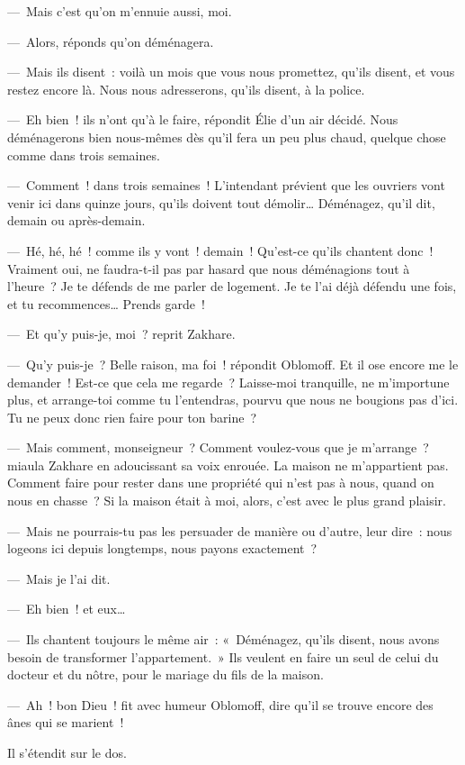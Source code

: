 \documentclass[french,twoside]{book} %
\begin{document}
— Mais c’est qu’on m’ennuie aussi, moi.\par
— Alors, réponds qu’on déménagera.\par
— Mais ils disent : voilà un mois que vous nous promettez, qu’ils disent, et vous restez encore là. Nous nous adresserons, qu’ils disent, à la police.\par
— Eh bien ! ils n’ont qu’à le faire, répondit Élie d’un air décidé. Nous déménagerons bien nous-mêmes dès qu’il fera un peu plus chaud, quelque chose comme dans trois semaines.\par
— Comment ! dans trois semaines ! L’intendant prévient que les ouvriers vont venir ici dans quinze jours, qu’ils doivent tout démolir… Déménagez, qu’il dit, demain ou après-demain.\par
— Hé, hé, hé ! comme ils y vont ! demain ! Qu’est-ce qu’ils chantent donc ! Vraiment oui, ne faudra-t-il pas par hasard que nous déménagions tout à l’heure ? Je te défends de me parler de logement. Je te l’ai déjà défendu une fois, et tu recommences… Prends garde !\par
— Et qu’y puis-je, moi ? reprit Zakhare.\par
— Qu’y puis-je ? Belle raison, ma foi ! répondit Oblomoff. Et il ose encore me le demander ! Est-ce que cela me regarde ? Laisse-moi tranquille, ne m’importune plus, et arrange-toi comme tu l’entendras, pourvu que nous ne bougions pas d’ici. Tu ne peux donc rien faire pour ton barine ?\par
— Mais comment, monseigneur ? Comment voulez-vous que je m’arrange ? miaula Zakhare en adoucissant sa voix enrouée. La maison ne m’appartient pas. Comment faire pour rester dans une propriété qui n’est pas à nous, quand on nous en chasse ? Si la maison était à moi, alors, c’est avec le plus grand plaisir.\par
— Mais ne pourrais-tu pas les persuader de manière ou d’autre, leur dire : nous logeons ici depuis longtemps, nous payons exactement ?\par
— Mais je l’ai dit.\par
— Eh bien ! et eux…\par
— Ils chantent toujours le même air : « Déménagez, qu’ils disent, nous avons besoin de transformer l’appartement. » Ils veulent en faire un seul de celui du docteur et du nôtre, pour le mariage du fils de la maison.\par
— Ah ! bon Dieu ! fit avec humeur Oblomoff, dire qu’il se trouve encore des ânes qui se marient !\par
Il s’étendit sur le dos.\par
\end{document}
